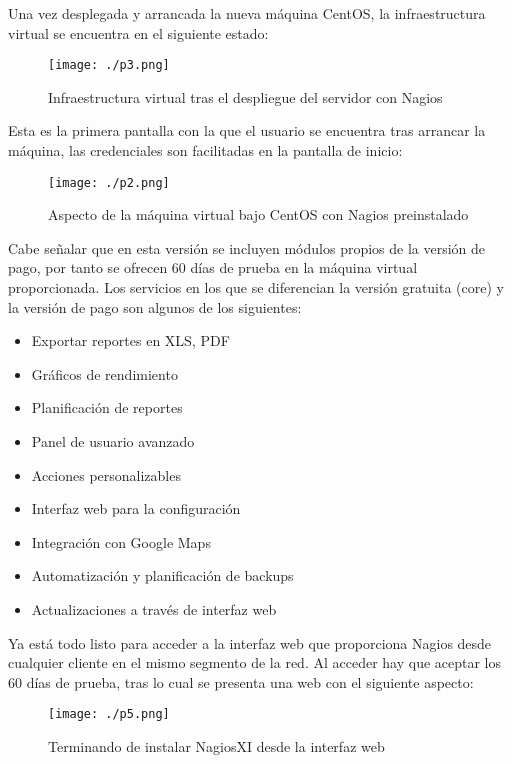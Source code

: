 \documentclass[paper=a4, fontsize=12pt]{scrartcl} %
\begin{document}
Una vez desplegada y arrancada la nueva máquina CentOS, la infraestructura virtual se encuentra en el siguiente estado:

\begin{figure}[H] %
	\centering
	\label{lsblk}
	\texttt{[image: ./p3.png]}
	\caption{Infraestructura virtual tras el despliegue del servidor con Nagios} 
\end{figure}

Esta es la primera pantalla con la que el usuario se encuentra tras arrancar la máquina, las credenciales son facilitadas en la pantalla de inicio:

\begin{figure}[H] %
	\centering
	\label{lsblk}
	\texttt{[image: ./p2.png]}
	\caption{Aspecto de la máquina virtual bajo CentOS con Nagios preinstalado} 
\end{figure}

Cabe señalar que en esta versión se incluyen módulos propios de la versión de pago, por tanto se ofrecen 60 días de prueba en la máquina virtual proporcionada. Los servicios en los que se diferencian la versión gratuita (core) y la versión de pago son algunos de los siguientes: \cite{p6}

\begin{itemize}
	\item Exportar reportes en XLS, PDF
	\item Gráficos de rendimiento
	\item Planificación de reportes
	\item Panel de usuario avanzado
	\item Acciones personalizables
	\item Interfaz web para la configuración
	\item Integración con Google Maps
	\item Automatización y planificación de backups
	\item Actualizaciones a través de interfaz web
\end{itemize}

Ya está todo listo para acceder a la interfaz web que proporciona Nagios desde cualquier cliente en el mismo segmento de la red. Al acceder hay que aceptar los 60 días de prueba, tras lo cual se presenta una web con el siguiente aspecto:

\begin{figure}[H] %
	\centering
	\label{lsblk}
	\texttt{[image: ./p5.png]}
	\caption{Terminando de instalar NagiosXI desde la interfaz web} 
\end{figure}
\end{document}
